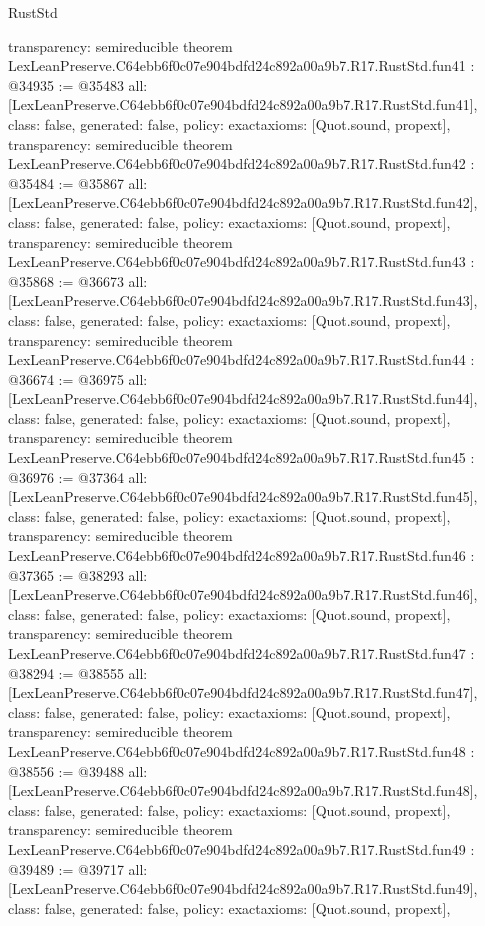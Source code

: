 \begin{lexlean}{RustStd}
\begin{coremodule}
{  transparency: semireducible
}
theorem LexLeanPreserve.C64ebb6f0c07e904bdfd24c892a00a9b7.R17.RustStd.fun41 : @34935 := @35483 {
  all: [LexLeanPreserve.C64ebb6f0c07e904bdfd24c892a00a9b7.R17.RustStd.fun41],
  class: false,
  generated: false,
  policy: exact{axioms: [Quot.sound, propext]},
  transparency: semireducible
}
theorem LexLeanPreserve.C64ebb6f0c07e904bdfd24c892a00a9b7.R17.RustStd.fun42 : @35484 := @35867 {
  all: [LexLeanPreserve.C64ebb6f0c07e904bdfd24c892a00a9b7.R17.RustStd.fun42],
  class: false,
  generated: false,
  policy: exact{axioms: [Quot.sound, propext]},
  transparency: semireducible
}
theorem LexLeanPreserve.C64ebb6f0c07e904bdfd24c892a00a9b7.R17.RustStd.fun43 : @35868 := @36673 {
  all: [LexLeanPreserve.C64ebb6f0c07e904bdfd24c892a00a9b7.R17.RustStd.fun43],
  class: false,
  generated: false,
  policy: exact{axioms: [Quot.sound, propext]},
  transparency: semireducible
}
theorem LexLeanPreserve.C64ebb6f0c07e904bdfd24c892a00a9b7.R17.RustStd.fun44 : @36674 := @36975 {
  all: [LexLeanPreserve.C64ebb6f0c07e904bdfd24c892a00a9b7.R17.RustStd.fun44],
  class: false,
  generated: false,
  policy: exact{axioms: [Quot.sound, propext]},
  transparency: semireducible
}
theorem LexLeanPreserve.C64ebb6f0c07e904bdfd24c892a00a9b7.R17.RustStd.fun45 : @36976 := @37364 {
  all: [LexLeanPreserve.C64ebb6f0c07e904bdfd24c892a00a9b7.R17.RustStd.fun45],
  class: false,
  generated: false,
  policy: exact{axioms: [Quot.sound, propext]},
  transparency: semireducible
}
theorem LexLeanPreserve.C64ebb6f0c07e904bdfd24c892a00a9b7.R17.RustStd.fun46 : @37365 := @38293 {
  all: [LexLeanPreserve.C64ebb6f0c07e904bdfd24c892a00a9b7.R17.RustStd.fun46],
  class: false,
  generated: false,
  policy: exact{axioms: [Quot.sound, propext]},
  transparency: semireducible
}
theorem LexLeanPreserve.C64ebb6f0c07e904bdfd24c892a00a9b7.R17.RustStd.fun47 : @38294 := @38555 {
  all: [LexLeanPreserve.C64ebb6f0c07e904bdfd24c892a00a9b7.R17.RustStd.fun47],
  class: false,
  generated: false,
  policy: exact{axioms: [Quot.sound, propext]},
  transparency: semireducible
}
theorem LexLeanPreserve.C64ebb6f0c07e904bdfd24c892a00a9b7.R17.RustStd.fun48 : @38556 := @39488 {
  all: [LexLeanPreserve.C64ebb6f0c07e904bdfd24c892a00a9b7.R17.RustStd.fun48],
  class: false,
  generated: false,
  policy: exact{axioms: [Quot.sound, propext]},
  transparency: semireducible
}
theorem LexLeanPreserve.C64ebb6f0c07e904bdfd24c892a00a9b7.R17.RustStd.fun49 : @39489 := @39717 {
  all: [LexLeanPreserve.C64ebb6f0c07e904bdfd24c892a00a9b7.R17.RustStd.fun49],
  class: false,
  generated: false,
  policy: exact{axioms: [Quot.sound, propext]},
}
\end{coremodule}
\end{lexlean}
